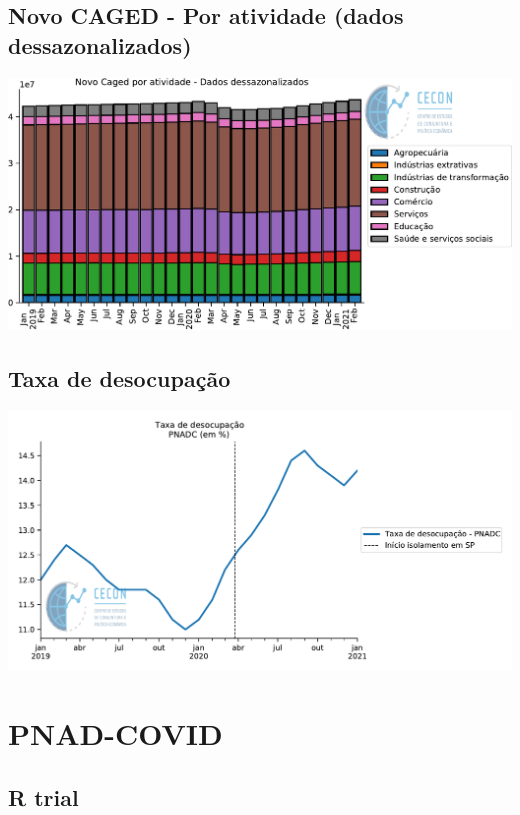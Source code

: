 \documentclass{SelfArx}
\begin{document}
\subsection*{Novo CAGED  - Por atividade (dados dessazonalizados)}
\label{sec:org090a01a}

\begin{center}
\includegraphics[width=.9\linewidth]{./figs/Emprego/NovoCaged_Atividade.pdf}
\end{center}



\subsection*{Taxa de desocupação}
\label{sec:org771e24e}

\begin{center}
\includegraphics[width=.9\linewidth]{./figs/Emprego/TaxaDesocupacao.pdf}
\end{center}

\section*{PNAD-COVID}
\label{sec:org91ff4d7}
\subsection*{R trial}
\label{sec:orgbc4d201}
\end{document}
